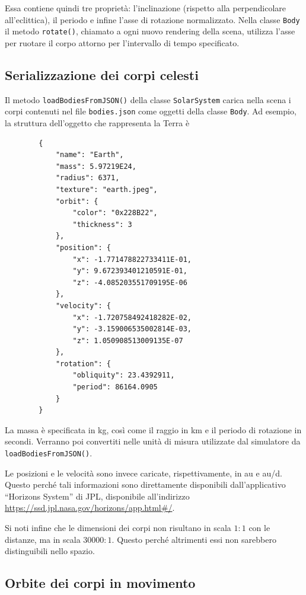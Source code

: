 \documentclass[11pt]{article}
\begin{document}
	Essa contiene quindi tre proprietà: l'inclinazione (rispetto alla perpendicolare all'eclittica), il periodo e infine l'asse di rotazione normalizzato. Nella classe \texttt{Body} il metodo \texttt{rotate()}, chiamato a ogni nuovo rendering della scena, utilizza l'asse per ruotare il corpo attorno per l'intervallo di tempo specificato.

	\subsection{Serializzazione dei corpi celesti}

	Il metodo \texttt{loadBodiesFromJSON()} della classe \texttt{SolarSystem} carica nella scena i corpi contenuti nel file \texttt{bodies.json} come oggetti della classe \texttt{Body}. Ad esempio, la struttura dell'oggetto che rappresenta la Terra è
	\begin{verbatim}
		{
			"name": "Earth",
			"mass": 5.97219E24,
			"radius": 6371,
			"texture": "earth.jpeg",
			"orbit": {
				"color": "0x228B22",
				"thickness": 3
			},
			"position": {
				"x": -1.771478822733411E-01,
				"y": 9.672393401210591E-01,
				"z": -4.085203551709195E-06
			},
			"velocity": {
				"x": -1.720758492418282E-02,
				"y": -3.159006535002814E-03,
				"z": 1.050908513009135E-07
			},
			"rotation": {
				"obliquity": 23.4392911, 
				"period": 86164.0905
			}
		}	
	\end{verbatim}

	La massa è specificata in \si{\kg}, così come il raggio in \si{\km} e il periodo di rotazione in secondi. Verranno poi convertiti nelle unità di misura utilizzate dal simulatore da \texttt{loadBodiesFromJSON()}. 
	
	Le posizioni e le velocità sono invece caricate, rispettivamente, in \si{\astronomicalunit} e \si{\astronomicalunit/\day}. Questo perché tali informazioni sono direttamente disponibili dall'applicativo ``Horizons System'' di JPL, disponibile all'indirizzo \url{https://ssd.jpl.nasa.gov/horizons/app.html#/}.

	Si noti infine che le dimensioni dei corpi non risultano in scala $1 \colon 1$ con le distanze, ma in scala $\num{30000} \colon 1$. Questo perché altrimenti essi non sarebbero distinguibili nello spazio.

	\subsection{Orbite dei corpi in movimento}
\end{document}
